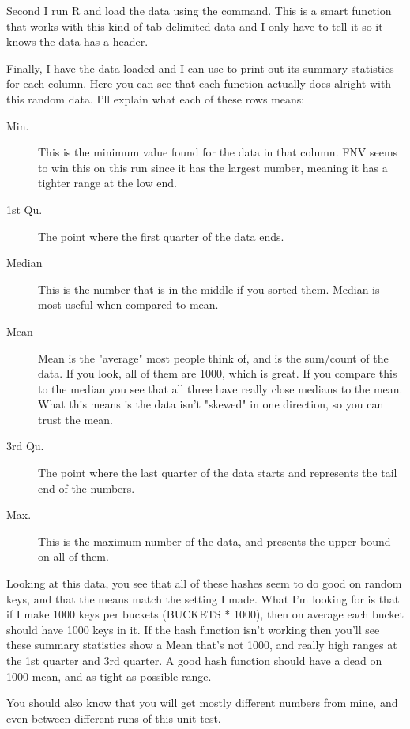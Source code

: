 Second I run R and load the data using the  command.  This
is a smart function that works with this kind of tab-delimited data and
I only have to tell it  so it knows the data has a header.

Finally, I have the data loaded and I can use  to print out
its summary statistics for each column.  Here you can see that each function
actually does alright with this random data.  I'll explain what each
of these rows means:

\begin{description}
\item[Min.] This is the minimum value found for the data in that column.
    FNV seems to win this on this run since it has the largest number, meaning
    it has a tighter range at the low end.
\item[1st Qu.] The point where the first quarter of the data ends.
\item[Median] This is the number that is in the middle if you sorted them.
    Median is most useful when compared to mean.
\item[Mean] Mean is the "average" most people think of, and is the sum/count
    of the data.  If you look, all of them are 1000, which is great.
    If you compare this to the median you see that all three have really
    close medians to the mean.  What this means is the data isn't "skewed"
    in one direction, so you can trust the mean.
\item[3rd Qu.] The point where the last quarter of the data starts and represents
    the tail end of the numbers.
\item[Max.] This is the maximum number of the data, and presents the upper
    bound on all of them.
\end{description}

Looking at this data, you see that all of these hashes seem to do good on random
keys, and that the means match the  setting I made.  What I'm
looking for is that if I make 1000 keys per buckets (BUCKETS * 1000), then on
average each bucket should have 1000 keys in it.  If the hash function isn't
working then you'll see these summary statistics show a Mean that's not 1000,
and really high ranges at the 1st quarter and 3rd quarter.  A good hash function
should have a dead on 1000 mean, and as tight as possible range.

You should also know that you will get mostly different numbers from mine, and
even between different runs of this unit test.

